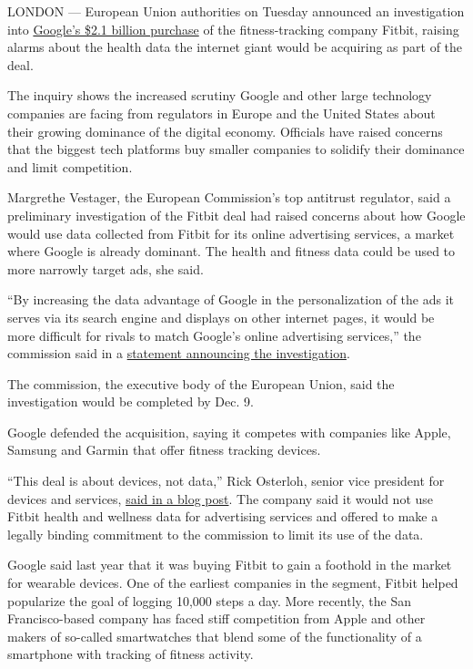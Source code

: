 LONDON --- European Union authorities on Tuesday announced an
investigation into
\href{https://www.nytimes.com/2019/11/01/technology/google-fitbit.html}{Google's
\$2.1 billion purchase} of the fitness-tracking company Fitbit, raising
alarms about the health data the internet giant would be acquiring as
part of the deal.

The inquiry shows the increased scrutiny Google and other large
technology companies are facing from regulators in Europe and the United
States about their growing dominance of the digital economy. Officials
have raised concerns that the biggest tech platforms buy smaller
companies to solidify their dominance and limit competition.

Margrethe Vestager, the European Commission's top antitrust regulator,
said a preliminary investigation of the Fitbit deal had raised concerns
about how Google would use data collected from Fitbit for its online
advertising services, a market where Google is already dominant. The
health and fitness data could be used to more narrowly target ads, she
said.

``By increasing the data advantage of Google in the personalization of
the ads it serves via its search engine and displays on other internet
pages, it would be more difficult for rivals to match Google's online
advertising services,'' the commission said in a
\href{https://ec.europa.eu/commission/presscorner/detail/en/ip_20_1446}{statement
announcing the investigation}.

The commission, the executive body of the European Union, said the
investigation would be completed by Dec. 9.

Google defended the acquisition, saying it competes with companies like
Apple, Samsung and Garmin that offer fitness tracking devices.

``This deal is about devices, not data,'' Rick Osterloh, senior vice
president for devices and services,
\href{https://blog.google/around-the-globe/google-europe/update-fitbit/}{said
in a blog post}. The company said it would not use Fitbit health and
wellness data for advertising services and offered to make a legally
binding commitment to the commission to limit its use of the data.

Google said last year that it was buying Fitbit to gain a foothold in
the market for wearable devices. One of the earliest companies in the
segment, Fitbit helped popularize the goal of logging 10,000 steps a
day. More recently, the San Francisco-based company has faced stiff
competition from Apple and other makers of so-called smartwatches that
blend some of the functionality of a smartphone with tracking of fitness
activity.

